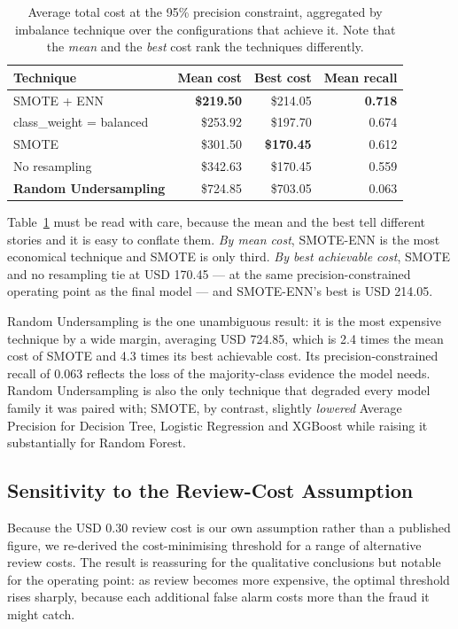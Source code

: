 \begin{table}[h!]
\centering
\caption{Average total cost at the 95\% precision constraint, aggregated by
imbalance technique over the configurations that achieve it. Note that the
\emph{mean} and the \emph{best} cost rank the techniques differently.}
\label{tab:techcost}
\begin{tabular}{lrrr}
\toprule
\textbf{Technique} & \textbf{Mean cost} & \textbf{Best cost} & \textbf{Mean recall} \\
\midrule
SMOTE + ENN & \textbf{\$219.50} & \$214.05 & \textbf{0.718} \\
class\_weight = balanced & \$253.92 & \$197.70 & 0.674 \\
SMOTE & \$301.50 & \textbf{\$170.45} & 0.612 \\
No resampling & \$342.63 & \$170.45 & 0.559 \\
\textbf{Random Undersampling} & \$724.85 & \$703.05 & 0.063 \\
\bottomrule
\end{tabular}
\end{table}

Table~\ref{tab:techcost} must be read with care, because the mean and the best
tell different stories and it is easy to conflate them. \emph{By mean cost},
SMOTE-ENN is the most economical technique and SMOTE is only third. \emph{By
best achievable cost}, SMOTE and no resampling tie at USD 170.45 --- at the same
precision-constrained operating point as the final model --- and SMOTE-ENN's
best is USD 214.05.

Random Undersampling is the one unambiguous result: it is the most expensive
technique by a wide margin, averaging USD 724.85, which is 2.4 times the mean
cost of SMOTE and 4.3 times its best achievable cost. Its precision-constrained
recall of 0.063 reflects the loss of the majority-class evidence the model
needs. Random Undersampling is also the only technique that degraded every
model family it was paired with; SMOTE, by contrast, slightly \emph{lowered}
Average Precision for Decision Tree, Logistic Regression and XGBoost while
raising it substantially for Random Forest.

\subsection{Sensitivity to the Review-Cost Assumption}
\label{sec:sensitivity}

Because the USD 0.30 review cost is our own assumption rather than a published
figure, we re-derived the cost-minimising threshold for a range of alternative
review costs. The result is reassuring for the qualitative conclusions but
notable for the operating point: as review becomes more expensive, the
optimal threshold rises sharply, because each additional false alarm costs
more than the fraud it might catch.

